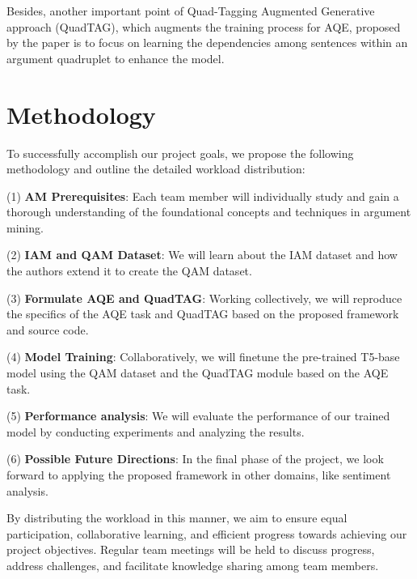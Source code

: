 \documentclass{article}
\begin{document}
Besides, another important point of Quad-Tagging Augmented Generative approach (QuadTAG), which augments the training process for AQE, proposed by the paper is to focus on learning the dependencies among sentences within an argument quadruplet to enhance the model.

\section{Methodology}

\noindent

To successfully accomplish our project goals, we propose the following methodology and outline the detailed workload distribution: 

(1) \textbf{AM Prerequisites}: Each team member will individually study and gain a thorough understanding of the foundational concepts and techniques in argument mining.

(2) \textbf{IAM and QAM Dataset}: We will learn about the IAM dataset and how the authors extend it to create the QAM dataset.

(3) \textbf{Formulate AQE and QuadTAG}: Working collectively, we will reproduce the specifics of the AQE task and QuadTAG based on the proposed framework and source code.

(4) \textbf{Model Training}: Collaboratively, we will finetune the pre-trained T5-base model using the QAM dataset and the QuadTAG module based on the AQE task.

(5) \textbf{Performance analysis}: We will evaluate the performance of our trained model by conducting experiments and analyzing the results.

(6) \textbf{Possible Future Directions}: In the final phase of the project, we look forward to applying the proposed framework in other domains, like sentiment analysis.

By distributing the workload in this manner, we aim to ensure equal participation, collaborative learning, and efficient progress towards achieving our project objectives. Regular team meetings will be held to discuss progress, address challenges, and facilitate knowledge sharing among team members.
\end{document}
